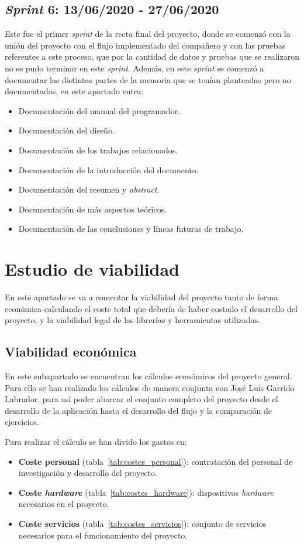 \subsection{\textit{Sprint} 6: 13/06/2020 - 27/06/2020}
Este fue el primer \textit{sprint} de la recta final del proyecto, donde se comenzó con la unión del proyecto con el flujo implementado del compañero y con las pruebas referentes a este proceso, que por la cantidad de datos y pruebas que se realizaron no se pudo terminar en este \textit{sprint}. Además, en este \textit{sprint} se comenzó a documentar las distintas partes de la memoria que se tenían planteadas pero no documentadas, en este apartado entra:
\begin{itemize}
	\item Documentación del manual del programador.
	\item Documentación del diseño.
	\item Documentación de los trabajos relacionados.
	\item Documentación de la introducción del documento.
	\item Documentación del resumen y \textit{abstract}.
	\item Documentación de más aspectos teóricos.
	\item Documentación de las conclusiones y líneas futuras de trabajo.
\end{itemize}

\section{Estudio de viabilidad}

En este apartado se va a comentar la viabilidad del proyecto tanto de forma económica calculando el coste total que debería de haber costado el desarrollo del proyecto, y la viabilidad legal de las librerías y herramientas utilizadas.

\subsection{Viabilidad económica}

En este subapartado se encuentran los cálculos económicos del proyecto general. Para ello se han realizado los cálculos de manera conjunta con José Luis Garrido Labrador, para así poder abarcar el conjunto completo del proyecto desde el desarrollo de la aplicación hasta el desarrollo del flujo y la comparación de ejercicios.

Para realizar el cálculo se han divido los gastos en:
\begin{itemize}
	\item \textbf{Coste personal} (tabla~\ref{tab:costes_personal}): contratación del personal de investigación y desarrollo del proyecto.
	\item \textbf{Coste \textit{hardware}} (tabla~\ref{tab:costes_hardware}): dispositivos \textit{hardware} necesarios en el proyecto.
	\item \textbf{Coste servicios} (tabla~\ref{tab:costes_servicios}): conjunto de servicios necesarios para el funcionamiento del proyecto.
\end{itemize}

